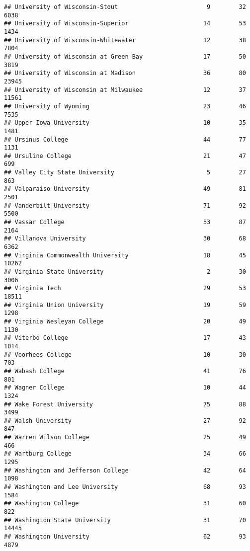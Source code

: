 \documentclass[
]{article}
\begin{document}
\begin{verbatim}
## University of Wisconsin-Stout                         9        32        6038
## University of Wisconsin-Superior                     14        53        1434
## University of Wisconsin-Whitewater                   12        38        7804
## University of Wisconsin at Green Bay                 17        50        3819
## University of Wisconsin at Madison                   36        80       23945
## University of Wisconsin at Milwaukee                 12        37       11561
## University of Wyoming                                23        46        7535
## Upper Iowa University                                10        35        1481
## Ursinus College                                      44        77        1131
## Ursuline College                                     21        47         699
## Valley City State University                          5        27         863
## Valparaiso University                                49        81        2501
## Vanderbilt University                                71        92        5500
## Vassar College                                       53        87        2164
## Villanova University                                 30        68        6362
## Virginia Commonwealth University                     18        45       10262
## Virginia State University                             2        30        3006
## Virginia Tech                                        29        53       18511
## Virginia Union University                            19        59        1298
## Virginia Wesleyan College                            20        49        1130
## Viterbo College                                      17        43        1014
## Voorhees College                                     10        30         703
## Wabash College                                       41        76         801
## Wagner College                                       10        44        1324
## Wake Forest University                               75        88        3499
## Walsh University                                     27        92         847
## Warren Wilson College                                25        49         466
## Wartburg College                                     34        66        1295
## Washington and Jefferson College                     42        64        1098
## Washington and Lee University                        68        93        1584
## Washington College                                   31        60         822
## Washington State University                          31        70       14445
## Washington University                                62        93        4879

\end{verbatim}
\end{document}
